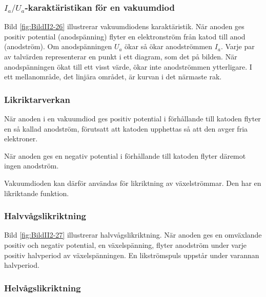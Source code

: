 \subsubsection{\(I_a/U_a\)-karaktäristikan för en vakuumdiod}


Bild \ref{fig:BildII2-26} illustrerar vakuumdiodens karaktäristik.
När anoden ges positiv potential (anodspänning) flyter en elektronström från
katod till anod (anodström).
Om anodspänningen \(U_a\) ökar så ökar anodströmmen \(I_a\).
Varje par av talvärden representerar en punkt i ett diagram, som det på bilden.
När anodspänningen ökat till ett visst värde, ökar inte anodströmmen ytterligare.
I ett mellanområde, det linjära området, är kurvan i det närmaste rak.

\subsubsection{Likriktarverkan}

När anoden i en vakuumdiod ges positiv potential i förhållande till katoden
flyter en så kallad anodström, förutsatt att katoden upphettas så att den avger
fria elektroner.

När anoden ges en negativ potential i förhållande till katoden flyter däremot
ingen anodström.

Vakuumdioden kan därför användas för likriktning av växelströmmar.
Den har en likriktande funktion.

\subsubsection{Halvvågslikriktning}

Bild \ref{fig:BildII2-27} illustrerar halvvågslikriktning.
När anoden ges en omväxlande positiv och negativ potential, en växelspänning,
flyter anodström under varje positiv halvperiod av växelspänningen.
En likströmspuls uppstår under varannan halvperiod.

\subsubsection{Helvågslikriktning}


